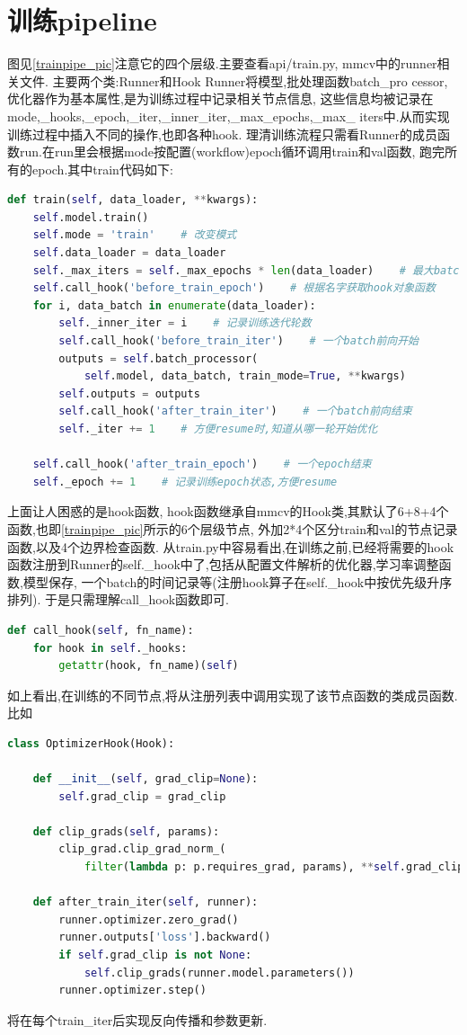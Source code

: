 \documentclass[UTF8]{ctexart}
\begin{document}
\section{训练pipeline}
\label{trainpipeline}
图见\ref{trainpipe_pic}注意它的四个层级.主要查看api/train.py, mmcv中的runner相关文件.
主要两个类:Runner和Hook
Runner将模型,批处理函数batch\_pro
cessor,优化器作为基本属性,是为训练过程中记录相关节点信息,
这些信息均被记录在mode,\_hooks,\_epoch,\_iter,\_inner\_iter,\_max\_epochs,\_max\_
iters中.从而实现训练过程中插入不同的操作,也即各种hook.
理清训练流程只需看Runner的成员函数run.在run里会根据mode按配置(workflow)epoch循环调用train和val函数,
跑完所有的epoch.其中train代码如下:
\lstset{style=mystyle}
\begin{lstlisting}[language=Python]
 def train(self, data_loader, **kwargs):
	self.model.train()
	self.mode = 'train'    # 改变模式
	self.data_loader = data_loader
	self._max_iters = self._max_epochs * len(data_loader)    # 最大batch循环次数
	self.call_hook('before_train_epoch')    # 根据名字获取hook对象函数
	for i, data_batch in enumerate(data_loader):
		self._inner_iter = i    # 记录训练迭代轮数
		self.call_hook('before_train_iter')    # 一个batch前向开始
		outputs = self.batch_processor(
			self.model, data_batch, train_mode=True, **kwargs)
		self.outputs = outputs
		self.call_hook('after_train_iter')    # 一个batch前向结束
		self._iter += 1    # 方便resume时,知道从哪一轮开始优化

	self.call_hook('after_train_epoch')    # 一个epoch结束
	self._epoch += 1    # 记录训练epoch状态,方便resume

\end{lstlisting}

上面让人困惑的是hook函数,
hook函数继承自mmcv的Hook类,其默认了6+8+4个函数,也即\ref{trainpipe_pic}所示的6个层级节点,
外加2*4个区分train和val的节点记录函数,以及4个边界检查函数.
从train.py中容易看出,在训练之前,已经将需要的hook函数注册到Runner的self.\_hook中了,包括从配置文件解析的优化器,学习率调整函数,模型保存,
一个batch的时间记录等(注册hook算子在self.\_hook中按优先级升序排列).
于是只需理解call\_hook函数即可.
\lstset{style=mystyle}
\begin{lstlisting}[language=Python]
def call_hook(self, fn_name):
	for hook in self._hooks:
		getattr(hook, fn_name)(self)
\end{lstlisting}

如上看出,在训练的不同节点,将从注册列表中调用实现了该节点函数的类成员函数.比如
\lstset{style=mystyle}
\begin{lstlisting}[language=Python]
class OptimizerHook(Hook):

    def __init__(self, grad_clip=None):
        self.grad_clip = grad_clip

    def clip_grads(self, params):
        clip_grad.clip_grad_norm_(
            filter(lambda p: p.requires_grad, params), **self.grad_clip)

    def after_train_iter(self, runner):
        runner.optimizer.zero_grad()
        runner.outputs['loss'].backward()
        if self.grad_clip is not None:
            self.clip_grads(runner.model.parameters())
        runner.optimizer.step()
\end{lstlisting}
将在每个train\_iter后实现反向传播和参数更新.
\end{document}
